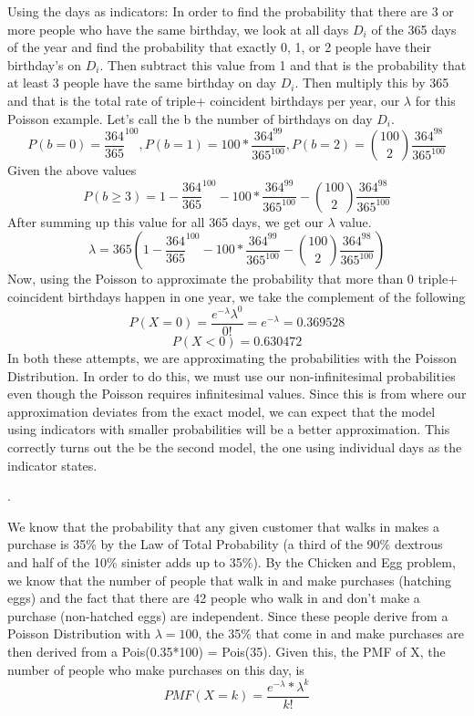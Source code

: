 \documentclass[11pt]{article}
\begin{document}
		Using the days as indicators:
		In order to find the probability that there are 3 or more people who have the same birthday, we look at all days $D_i$ of the 365 days of the year and find the probability that exactly 0, 1, or 2 people have their birthday's on $D_i$.  Then subtract this value from 1 and that is the probability that at least 3 people have the same birthday on day $D_i$.  Then multiply this by 365 and that is the total rate of triple+ coincident birthdays per year, our $\lambda$ for this Poisson example.  
		Let's call the b the number of birthdays on day $D_i$.
		$$P(b=0) = \frac{364}{365}^{100}, P(b=1) = 100*\frac{364^{99}}{365^{100}},P(b=2) = \binom{100}{2}\frac{364^{98}}{365^{100}}$$
		Given the above values $$ P(b\ge3) = 1- \frac{364}{365}^{100} - 100*\frac{364^{99}}{365^{100}} - \binom{100}{2}\frac{364^{98}}{365^{100}}$$
		After summing up this value for all 365 days, we get our $\lambda$ value.
		$$ \lambda = 365(1- \frac{364}{365}^{100} - 100*\frac{364^{99}}{365^{100}} - \binom{100}{2}\frac{364^{98}}{365^{100}})$$
		Now, using the Poisson to approximate the probability that more than 0 triple+ coincident birthdays happen in one year, we take the complement of the following 
		$$ P(X=0) = \frac{e^{-\lambda}\lambda^0}{0!} = e^{-\lambda} = 0.369528$$
		$$ \boxed{P(X<0) = 0.630472} $$
		In both these attempts, we are approximating the probabilities with the Poisson Distribution.  In order to do this, we must use our non-infinitesimal probabilities even though the Poisson requires infinitesimal values.  Since this is from where our approximation deviates from the exact model, we can expect that the model using indicators with smaller probabilities will be a better approximation.  This correctly turns out the be the second model, the one using individual days as the indicator states.  

\bigskip


.

	We know that the probability that any given customer that walks in makes a purchase is 35\% by the Law of Total Probability (a third of the 90\% dextrous and half of the 10\% sinister adds up to 35\%).  By the Chicken and Egg problem, we know that the number of people that walk in and make purchases (hatching eggs) and the fact that there are 42 people who walk in and don't make a purchase (non-hatched eggs) are independent. Since these people derive from a Poisson Distribution with $\lambda = 100$, the 35\% that come in and make purchases are then derived from a Pois(0.35*100) = Pois(35).  
	Given this, the PMF of X, the number of people who make purchases on this day, is 
	$$ \boxed{PMF(X=k) = \frac{e^{-\lambda}*\lambda^k}{k!}}$$
\bigskip
\end{document}
